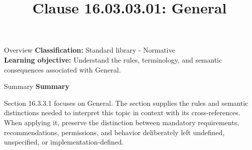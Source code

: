 \documentclass[10pt,letterpaper]{article}
\title{Clause 16.03.03.01: General}
\author{}
\date{}
\begin{document}
\maketitle
\begin{CornellOverviewBox}{Overview}
\textbf{Classification:} Standard library - Normative\\[2pt]
\textbf{Learning objective:} Understand the rules, terminology, and semantic consequences associated with General.
\end{CornellOverviewBox}\begin{CornellSummaryBox}{Summary}
{\sffamily\bfseries\color{Accent} Summary}\par\vspace{3pt}Section 16.3.3.1 focuses on General. The section supplies the rules and semantic distinctions needed to interpret this topic in context with its cross-references. When applying it, preserve the distinction between mandatory requirements, recommendations, permissions, and behavior deliberately left undefined, unspecified, or implementation-defined.
\end{CornellSummaryBox}
\end{document}
